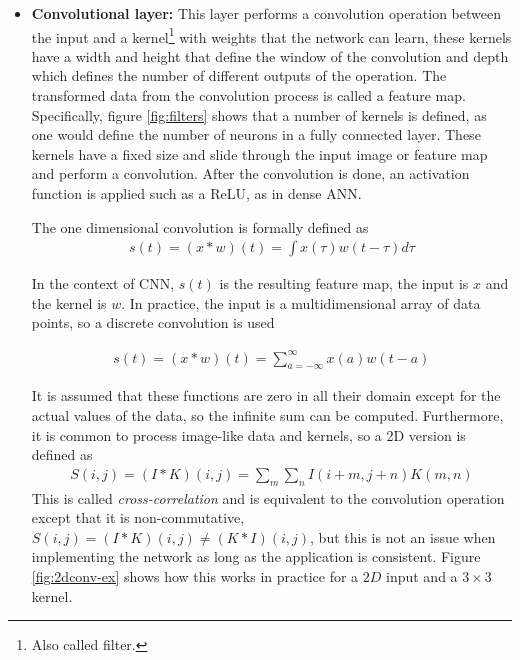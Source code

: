 \begin{itemize}
    \item \textbf{Convolutional layer:} This layer performs a convolution operation between the input and a kernel\footnote{Also called filter.} with weights that the network can learn, these kernels have a width and height that define the window of the convolution and depth which defines the number of different outputs of the operation. The transformed data from the convolution process is called a feature map. Specifically, figure \ref{fig:filters} shows that a number of kernels is defined, as one would define the number of neurons in a fully connected layer. These kernels have a fixed size and slide through the input image or feature map and perform a convolution. After the convolution is done, an activation function is applied such as a ReLU, as in dense ANN.
    
    The one dimensional convolution is formally defined as
    \begin{align*}
        s(t) = (x *w)(t)=\int x(\tau)w(t-\tau)d\tau
    \end{align*}
    
    In the context of CNN, $s(t)$ is the resulting feature map, the input is $x$ and the kernel is $w$. In practice, the input is a multidimensional array of data points, so a discrete convolution is used
    
    \begin{align*}
        s(t) = (x *w)(t)=\sum_{a=-\infty}^\infty x(a)w(t-a)
    \end{align*}
    
    It is assumed that these functions are zero in all their domain except for the actual values of the data, so the infinite sum can be computed. Furthermore, it is common to process image-like data and kernels, so a 2D version is defined as
    \begin{align*}
        S(i,j)=(I * K)(i,j)=\sum_{m}\sum_{n} I(i+m,j+n)K(m,n)
    \end{align*}
    This is called \textit{cross-correlation} and is equivalent to the convolution operation except that it is non-commutative, $S(i,j) = (I*K)(i,j)\neq (K*I) (i,j) $, but this is not an issue when implementing the network as long as the application is consistent. Figure \ref{fig:2dconv-ex} shows how this works in practice for a $2D$ input and a $3\times 3$ kernel.
    

\end{itemize}
